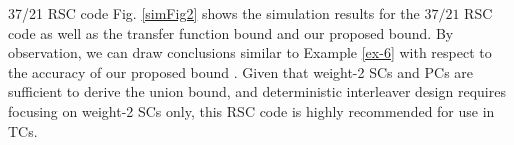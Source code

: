 \begin{example}{37/21 RSC code}
Fig. \ref{simFig2} shows the simulation results for the $37/21$ RSC code as well as  the transfer function bound and our proposed bound. By observation, we can draw conclusions similar to  Example \ref{ex-6} with respect to the accuracy of our proposed bound . Given that weight-2 SCs and PCs are sufficient to derive the union bound, and deterministic interleaver design requires focusing on weight-2 SCs only, this RSC code is highly recommended for use in TCs.

\label{ex-7}
\end{example}

